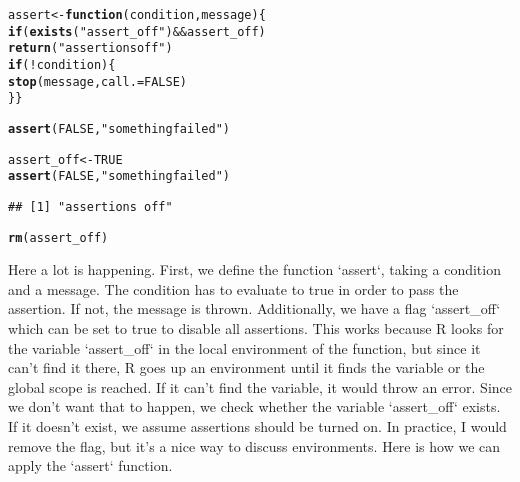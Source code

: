 \documentclass[twoside,twocolumn]{article}\usepackage[]{graphicx}\usepackage[dvipsnames]{xcolor}
\makeatletter
\newcommand{\hlnum}[1]{\textcolor[rgb]{0.686,0.059,0.569}{#1}}%
\newcommand{\hlstr}[1]{\textcolor[rgb]{0.192,0.494,0.8}{#1}}%
\newcommand{\hlopt}[1]{\textcolor[rgb]{0,0,0}{#1}}%
\newcommand{\hlstd}[1]{\textcolor[rgb]{0.345,0.345,0.345}{#1}}%
\newcommand{\hlkwa}[1]{\textcolor[rgb]{0.161,0.373,0.58}{\textbf{#1}}}%
\newcommand{\hlkwb}[1]{\textcolor[rgb]{0.69,0.353,0.396}{#1}}%
\newcommand{\hlkwc}[1]{\textcolor[rgb]{0.333,0.667,0.333}{#1}}%
\newcommand{\hlkwd}[1]{\textcolor[rgb]{0.737,0.353,0.396}{\textbf{#1}}}%
\newenvironment{kframe}{%
 \def\at@end@of@kframe{}%
 \ifinner\ifhmode%
  \def\at@end@of@kframe{\end{minipage}}%
  \begin{minipage}{\columnwidth}%
 \fi\fi%
 \def\FrameCommand##1{\hskip\@totalleftmargin \hskip-\fboxsep
 \colorbox{shadecolor}{##1}\hskip-\fboxsep
     \hskip-\linewidth \hskip-\@totalleftmargin \hskip\columnwidth}%
 \MakeFramed {\advance\hsize-\width
   \@totalleftmargin\z@ \linewidth\hsize
   \@setminipage}}%
 {\par\unskip\endMakeFramed%
 \at@end@of@kframe}
\newenvironment{knitrout}{}{} %
\makeatother
\begin{document}
\begin{knitrout}
\color{fgcolor}\begin{kframe}
\begin{alltt}
\hlstd{assert} \hlkwb{<-} \hlkwa{function}\hlstd{(}\hlkwc{condition}\hlstd{,} \hlkwc{message}\hlstd{)\{}
  \hlkwa{if}\hlstd{(}\hlkwd{exists}\hlstd{(}\hlstr{"assert_off"}\hlstd{)}\hlopt{&&}\hlstd{assert_off)}
    \hlkwd{return}\hlstd{(}\hlstr{"assertions off"}\hlstd{)}
  \hlkwa{if} \hlstd{(}\hlopt{!}\hlstd{condition) \{}
    \hlkwd{stop}\hlstd{(message,} \hlkwc{call.} \hlstd{=} \hlnum{FALSE}\hlstd{)}
  \hlstd{\}\}}
\end{alltt}
\end{kframe}
\end{knitrout}
\begin{knitrout}
\color{fgcolor}\begin{kframe}
\begin{alltt}
\hlkwd{assert}\hlstd{(}\hlnum{FALSE}\hlstd{,} \hlstr{"something failed"}\hlstd{)}
\end{alltt}


{\ttfamily\noindent\bfseries\color{errorcolor}{\#\# Error: something failed}}\begin{alltt}
\hlstd{assert_off} \hlkwb{<-} \hlnum{TRUE}
\hlkwd{assert}\hlstd{(}\hlnum{FALSE}\hlstd{,} \hlstr{"something failed"}\hlstd{)}
\end{alltt}
\begin{verbatim}
## [1] "assertions off"
\end{verbatim}
\begin{alltt}
\hlkwd{rm}\hlstd{(assert_off)}
\end{alltt}
\end{kframe}
\end{knitrout}

Here a lot is happening. First, we define the function `assert`, taking a condition and a message. The condition has to evaluate to true in order to pass the assertion. If not, the message is thrown. Additionally, we have a flag `assert\_off` which can be set to true to disable all assertions. This works because R looks for the variable `assert\_off` in the local environment of the function, but since it can't find it there, R goes up an environment until it finds the variable or the global scope is reached. If it can't find the variable, it would throw an error. Since we don't want that to happen, we check whether the variable `assert\_off` exists. If it doesn't exist, we assume assertions should be turned on. In practice, I would remove the flag, but it's a nice way to discuss environments. Here is how we can apply the `assert` function.
\end{document}
